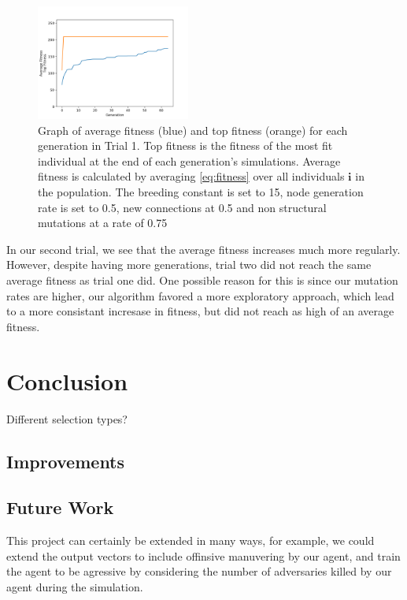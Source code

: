 \documentclass{article}
\begin{document}
\begin{multicols}{2}
\begin{figure}[H]\label{fig:fitness graph}
\centering
\includegraphics[width=0.45\textwidth]{fig_2}
\begin{changemargin}{0.15in}{0.15in}
  \caption{Graph of average fitness (blue) and top fitness (orange) for each
    generation in Trial 1. Top fitness is the fitness of the most fit individual
    at the end of each generation's simulations. Average fitness is calculated
    by averaging \eqref{eq:fitness} over all individuals $\bm{i}$ in the
    population. The breeding constant is set to 15, node generation rate is set
    to 0.5, new connections at 0.5 and non structural mutations at a rate of
    0.75}
\end{changemargin}
\end{figure}

In our second trial, we see that the average fitness increases much more
regularly. However, despite having more generations, trial two did not reach the
same average fitness as trial one did. One possible reason for this is since our
mutation rates are higher, our algorithm favored a more exploratory approach,
which lead to a more consistant incresase in fitness, but did not reach as high
of an average fitness.


\section{Conclusion}
Different selection types?
\blindtext

\subsection{Improvements}
\blindtext
\blindtext

\subsection{Future Work}
This project can certainly be extended in many ways, for example, we could
extend the output vectors to include offinsive manuvering by our agent, and
train the agent to be agressive by considering the number of adversaries killed
by our agent during the simulation.


\end{multicols}
\end{document}
